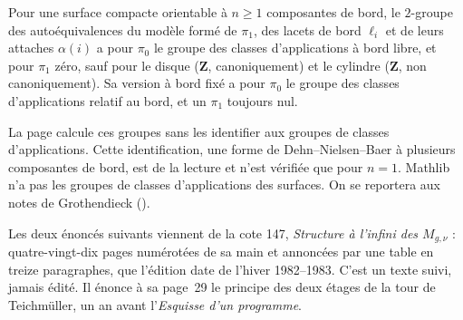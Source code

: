 \begin{encadre}
\begin{exemple*}\nonverifie
Pour une surface compacte orientable à $n \geq 1$ composantes de bord, le $2$-groupe des autoéquivalences du modèle formé de $\pi_1$, des lacets de bord $\ell_i$ et de leurs attaches $\alpha(i)$ a pour $\pi_0$ le groupe des classes d'applications à bord libre, et pour $\pi_1$ zéro, sauf pour le disque ($\mathbf Z$, canoniquement) et le cylindre ($\mathbf Z$, non canoniquement). Sa version à bord fixé a pour $\pi_0$ le groupe des classes d'applications relatif au bord, et un $\pi_1$ toujours nul.
\end{exemple*}
\end{encadre}
{\small La page calcule ces groupes sans les identifier aux groupes de classes d'applications. Cette identification, une forme de Dehn--Nielsen--Baer à plusieurs composantes de bord, est de la lecture et n'est vérifiée que pour $n = 1$. Mathlib n'a pas les groupes de classes d'applications des surfaces. On se reportera aux notes de Grothendieck ().\par}

\noindent Les deux énoncés suivants viennent de la cote 147, \emph{Structure à l'infini des $M_{g,\nu}$} : quatre-vingt-dix pages numérotées de sa main et annoncées par une table en treize paragraphes, que l'édition date de l'hiver 1982--1983. C'est un texte suivi, jamais édité. Il énonce à sa page~29 le principe des deux étages de la tour de Teichmüller, un an avant l'\emph{Esquisse d'un programme}.\par\medskip

